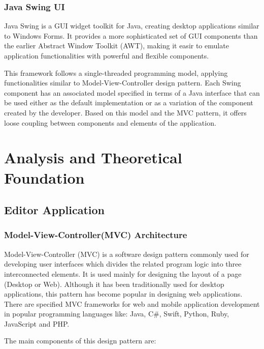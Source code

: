 \documentclass[12pt,a4paper,twoside]{report}
\begin{document}
\subsection{Java Swing UI}

Java Swing is a GUI widget toolkit for Java, creating desktop applications similar to Windows Forms. It provides a more sophisticated set of GUI components than the earlier Abstract Window Toolkit (AWT), making it easir to emulate application functionalities with powerful and flexible components. 

This framework follows a single-threaded programming model, applying functionalities similar to Model-View-Controller design pattern. Each Swing component has an associated model specified in terms of a Java interface that can be used either as the default implementation or as a variation of the component created by the developer. Based on this model and the MVC pattern, it offers loose coupling between components and elements of the application.


\chapter{Analysis and Theoretical Foundation}
\section{Editor Application}
\subsection{Model-View-Controller(MVC) Architecture}

Model-View-Controller (MVC) is a software design pattern commonly used for developing user interfaces which divides the related program logic into three interconnected elements. It is used mainly for designing the layout of a page (Desktop or Web). Although it has been traditionally used for desktop applications, this pattern has become popular in designing web applications. There are specified MVC frameworks for web and mobile application development in popular programming languages like: Java, C\#, Swift, Python, Ruby, JavaScript and PHP.


The main components of this design pattern are:
\end{document}
